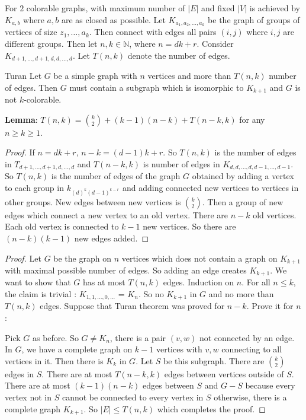 \documentclass{report}
\begin{document}
For $2$ colorable graphs, with maximum number of $\lvert E \rvert$ and fixed $\lvert V \rvert$ is achieved by $K_{a, b}$ where $a, b$ are as closed as possible. Let $K_{a_{1}, a_{2}, \ldots, a_{k}}$ be the graph of groups of vertices of size $z_{1}, \ldots, a_{k}$. Then connect with edges all pairs $(i, j)$ where $i, j$ are different groups. Then let $n, k \in \mathbb{N}$, where $n = dk + r$. Consider $K_{d + 1, \ldots, d + 1, d, d, \ldots, d}$. Let $T(n, k)$ denote the number of edges.

\begin{theorem}{Turan}
    Let $G$ be a simple graph with $n$ vertices and more than $T(n, k)$ number of edges. Then $G$ must contain a subgraph which is isomorphic to $K_{k + 1}$ and $G$ is not $k$-colorable.
\end{theorem}
\textbf{Lemma}: $T(n, k) = \binom{k}{2} + (k - 1)(n - k) + T(n - k, k)$ for any $n \geq k \geq 1$. 
    \begin{proof}
        If $n = dk + r$, $n - k = (d - 1)k + r$. So $T(n, k)$ is the number of edges in $T_{d+ 1, \ldots, d + 1, d, \ldots, d}$ and $T(n - k, k)$ is number of edges in $K_{d, d, \ldots, d, d - 1, \ldots, d - 1}$. So $T(n, k)$ is the number of edges of the graph $G$ obtained by adding a vertex to each group in $k_{(d)^{k}(d - 1)^{k - r}}$ and adding connected new vertices to vertices in other groups. New edges between new vertices is $\binom{k}{2}$. Then a group of new edges which connect a new vertex to an old vertex. There are $n - k$ old vertices. Each old vertex is connected to $k - 1$ new vertices. So there are $(n - k)(k - 1)$ new edges added.
    \end{proof}
\begin{proof}
    Let $G$ be the graph on $n$ vertices which does not contain a graph on $K_{k + 1}$ with maximal possible number of edges. So adding an edge creates $K_{k + 1}$. We want to show that $G$ has at most $T(n, k)$ edges. Induction on $n$. For all $n \leq k$, the claim is trivial : $K_{1, 1, \ldots, 0, \ldots}$ = $K_{n}$. So no $K_{k + 1}$ in $G$ and no more than $T(n,k)$ edges. Suppose that Turan theorem was proved for $n - k$. Prove it for $n$: 

    Pick $G$ as before. So $G \neq K_{n}$, there is a pair $(v, w)$ not connected by an edge. In $G$, we have a complete graph on $k - 1$ vertices with $v, w$ connecting to all vertices in it. Then there is $K_{k}$ in $G$. Let $S$ be this subgraph. There are $\binom{k}{2}$ edges in $S$. There are at most $T(n - k, k)$ edges between vertices outside of $S$. There are at most $(k - 1)(n - k)$ edges between $S$ and $G - S$ because every vertex not in $S$ cannot be connected to every vertex in $S$ otherwise, there is a complete graph $K_{k + 1}$. So $\lvert E \rvert \leq T(n, k)$ which completes the proof.
\end{proof}
\end{document}

